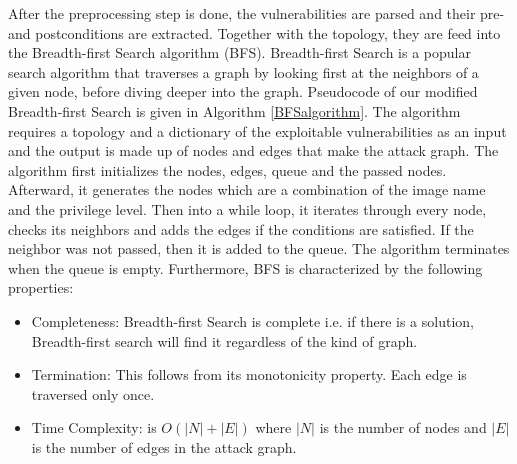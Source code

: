After the preprocessing step is done, the vulnerabilities are parsed and their pre- and postconditions are extracted. Together with the topology, they are feed into the Breadth-first Search algorithm (BFS).
Breadth-first Search is a popular search algorithm that traverses a graph by looking first at the neighbors of a given node, before diving deeper into the graph. Pseudocode of our modified Breadth-first Search is given in Algorithm \ref{BFSalgorithm}. The algorithm requires a topology and a dictionary of the exploitable vulnerabilities as an input and the output is made up of nodes and edges that make the attack graph. The algorithm first initializes the nodes, edges, queue and the passed nodes. Afterward, it generates the nodes which are a combination of the image name and the privilege level. Then into a while loop, it iterates through every node, checks its neighbors and adds the edges if the conditions are satisfied. If the neighbor was not passed, then it is added to the queue. The algorithm terminates when the queue is empty. Furthermore, BFS is characterized by the following properties:

\begin{itemize}
	\item Completeness: Breadth-first Search is complete i.e. if there is a solution, Breadth-first search will find it regardless of the kind of graph.
	\item Termination: This follows from its monotonicity property. Each edge is traversed only once.
	\item Time Complexity: is $O(|N| + |E|)$ where $|N|$ is the number of nodes and $|E|$ is the number of edges in the attack graph.
\end{itemize}
